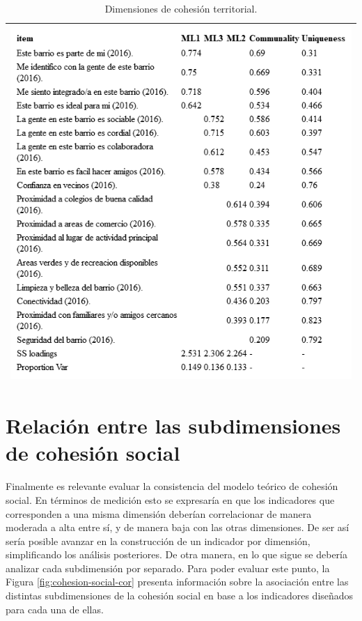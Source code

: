 \documentclass[
  12pt,
]{book}
\begin{document}
\begin{longtable}[]{@{}l@{}}
\caption{\label{tab:cohesion-territorial-fa}Dimensiones de cohesión territorial.}\tabularnewline
\toprule
\endhead
\includegraphics[width=8.33333in,height=\textheight]{output/tables/cohesion_territorial_fa.png}\tabularnewline
\bottomrule
\end{longtable}

\hypertarget{relaciuxf3n-entre-las-subdimensiones-de-cohesiuxf3n-social}{%
\section{Relación entre las subdimensiones de cohesión social}\label{relaciuxf3n-entre-las-subdimensiones-de-cohesiuxf3n-social}}

Finalmente es relevante evaluar la consistencia del modelo teórico de cohesión social. En términos de medición esto se expresaría en que los indicadores que corresponden a una misma dimensión deberían correlacionar de manera moderada a alta entre sí, y de manera baja con las otras dimensiones. De ser así sería posible avanzar en la construcción de un indicador por dimensión, simplificando los análisis posteriores. De otra manera, en lo que sigue se debería analizar cada subdimensión por separado. Para poder evaluar este punto, la Figura \ref{fig:cohesion-social-cor} presenta información sobre la asociación entre las distintas subdimensiones de la cohesión social en base a los indicadores diseñados para cada una de ellas.
\end{document}
